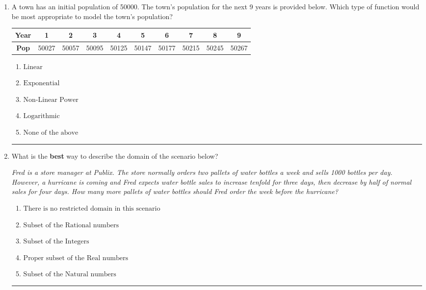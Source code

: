 \documentclass[14pt]{extbook}
\newcommand{\litem}[1]{\item#1\hspace*{-1cm}\rule{\textwidth}{0.4pt}}
\begin{document}
\begin{enumerate}
\litem{
A town has an initial population of 50000. The town's population for the next 9 years is provided below. Which type of function would be most appropriate to model the town's population?

\begin{tabular}{c|c|c|c|c|c|c|c|c|c}
\textbf{Year} &1 &2 &3 &4 &5 &6 &7 &8 &9\tabularnewline \hline
\textbf{Pop} &50027 &50057 &50095 &50125 &50147 &50177 &50215 &50245 &50267\end{tabular}\begin{enumerate}[label=\Alph*.]
\item \( \text{Linear} \)
\item \( \text{Exponential} \)
\item \( \text{Non-Linear Power} \)
\item \( \text{Logarithmic} \)
\item \( \text{None of the above} \)

\end{enumerate} }
\litem{
What is the \textbf{best} way to describe the domain of the scenario below?
\begin{center}
    \textit{ Fred is a store manager at Publix. The store normally orders two pallets of water bottles a week and sells 1000 bottles per day. However, a hurricane is coming and Fred expects water bottle sales to increase tenfold for three days, then decrease by half of normal sales for four days. How many more pallets of water bottles should Fred order the week before the hurricane? }
\end{center}
\begin{enumerate}[label=\Alph*.]
\item \( \text{There is no restricted domain in this scenario} \)
\item \( \text{Subset of the Rational numbers} \)
\item \( \text{Subset of the Integers} \)
\item \( \text{Proper subset of the Real numbers} \)
\item \( \text{Subset of the Natural numbers} \)


\end{enumerate}}
\end{enumerate}
\end{document}
